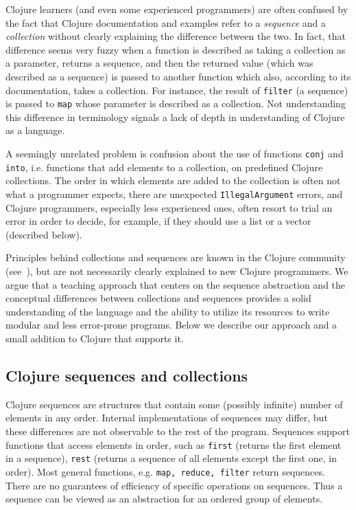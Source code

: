 \documentclass[submission,copyright,creativecommons]{eptcs}
\newcommand{\clocode}[1]{{\tt {#1}}}
\begin{document}
Clojure learners (and even some experienced programmers) are often confused by the fact that Clojure documentation and examples refer to a {\it sequence} and a {\it collection} without clearly explaining the difference between the two. In fact, that difference seems very fuzzy when a function is described as taking a collection as a parameter, returns a sequence, and then the returned value (which was described as a sequence) is passed to another function which also, according to its documentation, takes a collection. For instance, the result of \clocode{filter} (a sequence) is passed to \clocode{map} whose parameter is described as a collection.  Not understanding this difference in terminology signals a lack of depth in understanding of Clojure as a language.

A seemingly unrelated problem is confusion about the use of functions \clocode{conj} and \clocode{into}, i.e. functions that add elements to a collection, on predefined Clojure collections. The order in which elements are added to the collection is often not what a programmer expects, there are unexpected {\tt IllegalArgument} errors, and Clojure programmers, especially less experienced ones, often resort to trial an error in order to decide, for example, if they should use a list or a vector (described below).

Principles behind collections and sequences are known in the Clojure community (see~\cite{JC}), but are not necessarily clearly explained to new Clojure programmers. We argue that a teaching approach that centers on the sequence abstraction and the conceptual differences between collections and sequences provides a solid understanding of the language and the ability to utilize its resources to write modular and less error-prone programs. Below we describe our approach and a small addition to Clojure that supports it. 

\subsection{Clojure sequences and collections}\label{seq-abstr}
Clojure sequences are structures that contain some (possibly infinite) number of elements in any order. Internal implementations of sequences may differ, but these differences are not observable to the rest of the program. Sequences support functions that access elements in order, such as \clocode{first} (returns the first element in a sequence), \clocode{rest} (returns a sequence of all elements except the first one, in order). Most general functions, e.g. \clocode{map, reduce, filter} return sequences. There are no guarantees of efficiency of specific operations on sequences. Thus a sequence can be viewed as an abstraction for an ordered group of elements. 
\end{document}
